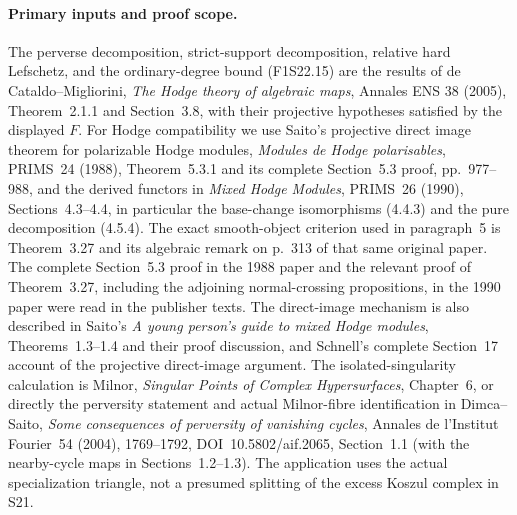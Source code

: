 \paragraph{Primary inputs and proof scope.}
The perverse decomposition, strict-support decomposition,
relative hard Lefschetz, and the ordinary-degree bound
(F1S22.15) are the results of de Cataldo--Migliorini,
\emph{The Hodge theory of algebraic maps}, Annales ENS
38 (2005), Theorem~2.1.1 and Section~3.8, with their
projective hypotheses satisfied by the displayed $F$.
For Hodge compatibility we use Saito's projective direct
image theorem for polarizable Hodge modules,
\emph{Modules de Hodge polarisables}, PRIMS~24 (1988),
Theorem~5.3.1 and its complete Section~5.3 proof,
pp.~977--988, and the derived functors in
\emph{Mixed Hodge Modules}, PRIMS~26 (1990),
Sections~4.3--4.4, in particular the base-change
isomorphisms (4.4.3) and the pure decomposition (4.5.4).
The exact smooth-object
criterion used in paragraph~5 is Theorem~3.27 and its
algebraic remark on p.~313 of that same original paper.
The complete Section~5.3 proof in the 1988 paper and
the relevant proof of Theorem~3.27, including the adjoining
normal-crossing propositions, in the 1990 paper were read
in the publisher texts. The direct-image mechanism is
also described in Saito's \emph{A young person's guide
to mixed Hodge modules}, Theorems~1.3--1.4 and their
proof discussion, and Schnell's complete Section~17
account of the projective direct-image argument.
The isolated-singularity calculation is Milnor,
\emph{Singular Points of Complex Hypersurfaces},
Chapter~6, or directly the perversity statement and
actual Milnor-fibre identification in Dimca--Saito,
\emph{Some consequences of perversity of vanishing
cycles}, Annales de l'Institut Fourier~54 (2004),
1769--1792, DOI~10.5802/aif.2065, Section~1.1
(with the nearby-cycle maps in Sections~1.2--1.3).
The application uses the actual
specialization triangle, not a presumed splitting of
the excess Koszul complex in S21.
